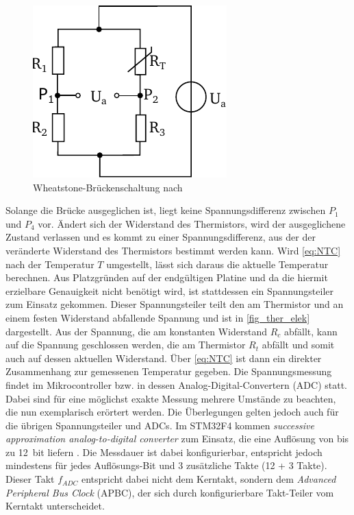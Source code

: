 \begin{figure} [h]
	\centering
	\includegraphics[width=0.4\linewidth]{Bilder/wheatstone.pdf}
	\caption{Wheatstone-Brückenschaltung nach \cite[S.12]{Weissgerber2018}}
	\label{fig:wheatstone}
\end{figure}\noindent
Solange die Brücke ausgeglichen ist, liegt keine Spannungsdifferenz zwischen $P_1$ und $P_4$ vor. Ändert sich der Widerstand des Thermistors, wird der ausgeglichene Zustand verlassen und es kommt zu einer Spannungsdifferenz, aus der der veränderte Widerstand des Thermistors bestimmt werden kann. Wird \autoref{eq:NTC} nach der Temperatur $T$ umgestellt, lässt sich daraus die aktuelle Temperatur berechnen. Aus Platzgründen auf der endgültigen Platine und da die hiermit erzielbare Genauigkeit nicht benötigt wird, ist stattdessen ein Spannungsteiler zum Einsatz gekommen. Dieser Spannungsteiler teilt den am Thermistor und an einem festen Widerstand abfallende Spannung und ist in \autoref{fig_ther_elek} dargestellt. Aus der Spannung, die am konstanten Widerstand $R_c$ abfällt, kann auf die Spannung geschlossen werden, die am Thermistor $R_t$ abfällt und somit auch auf dessen aktuellen Widerstand. Über \autoref{eq:NTC} ist dann ein direkter Zusammenhang zur gemessenen Temperatur gegeben.
Die Spannungsmessung findet im Mikrocontroller bzw. in dessen Analog-Digital-Convertern (ADC) statt. Dabei sind für eine möglichst exakte Messung mehrere Umstände zu beachten, die nun exemplarisch erörtert werden. Die Überlegungen gelten jedoch auch für die übrigen Spannungsteiler und ADCs. Im STM32F4 kommen \textit{successive approximation analog-to-digital converter} zum Einsatz, die eine Auflösung von bis zu \SI{12}{bit} liefern \cite{stmref}. Die Messdauer ist dabei konfigurierbar, entspricht jedoch mindestens für jedes Auflösungs-Bit und 3 zusätzliche Takte (12 + 3 Takte)\cite[S.397]{stmref}. Dieser Takt $f_{ADC}$ entspricht dabei nicht dem Kerntakt, sondern dem \textit{Advanced Peripheral Bus Clock} (APBC), der sich durch konfigurierbare Takt-Teiler vom Kerntakt unterscheidet. \\
